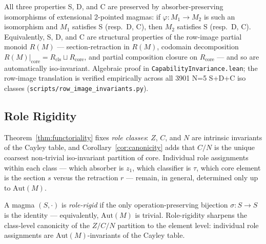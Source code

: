 \documentclass[sigconf,screen]{acmart}
\newcommand{\dotop}{\cdot}
\newcommand{\core}{\mathrm{core}}
\theoremstyle{remark}
\begin{document}
\begin{theorem}
\label{thm:cap-invariance}
All three properties S, D, and C are preserved by absorber-preserving isomorphisms of extensional 2-pointed magmas: if $\varphi : M_1 \to M_2$ is such an isomorphism and $M_1$ satisfies S (resp.\ D, C), then $M_2$ satisfies S (resp.\ D, C). Equivalently, S, D, and C are structural properties of the row-image partial monoid $R(M)$ — section-retraction in $R(M)$, codomain decomposition $R(M)|_{\core} = R_{\mathrm{cls}} \sqcup R_{\core}$, and partial composition closure on $R_{\core}$ — and so are automatically iso-invariant. Algebraic proof in \texttt{CapabilityInvariance.lean}; the row-image translation is verified empirically across all 3901 N=5 S+D+C iso classes (\texttt{scripts/row\_image\_invariants.py}).
\end{theorem}

\subsection{Role Rigidity}
\label{subsec:rigidity}

Theorem~\ref{thm:functoriality} fixes \emph{role classes}: $Z$, $C$, and $N$ are intrinsic invariants of the Cayley table, and Corollary~\ref{cor:canonicity} adds that $C/N$ is the unique coarsest non-trivial iso-invariant partition of core. Individual role assignments within each class --- which absorber is $z_1$, which classifier is $\tau$, which core element is the section $s$ versus the retraction $r$ --- remain, in general, determined only up to $\mathrm{Aut}(M)$.

\begin{definition}
\label{def:role-rigid}
A magma $(S, \dotop)$ is \emph{role-rigid} if the only operation-preserving bijection $\sigma : S \to S$ is the identity --- equivalently, $\mathrm{Aut}(M)$ is trivial. Role-rigidity sharpens the class-level canonicity of the $Z/C/N$ partition to the element level: individual role assignments are $\mathrm{Aut}(M)$-invariants of the Cayley table.
\end{definition}
\end{document}

